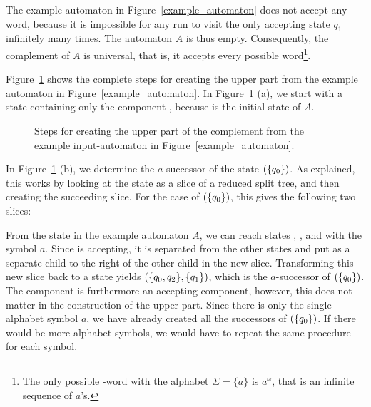 The example automaton in Figure~\ref{example_automaton} does not accept any word, because it is impossible for any run to visit the only accepting state $q_1$ infinitely many times. The automaton $A$ is thus empty. Consequently, the complement of $A$ is universal, that is, it accepts every possible word\footnote{The only possible \om-word with the alphabet $\Sigma = \{a\}$ is $a^\omega$, that is an infinite sequence of $a$'s.}.

Figure~\ref{steps_upper} shows the complete steps for creating the upper part from the example automaton in Figure~\ref{example_automaton}. In Figure~\ref{steps_upper} (a), we start with a state containing only the component , because  is the initial state of $A$.

\begin{figure}[htb]
\centering
  \begin{subfigure}[t]{0.49\textwidth}
  \centering
  \UpperPartA
  \caption{}
  \end{subfigure}
  \hfill
  \begin{subfigure}[t]{0.49\textwidth}
  \centering
  \UpperPartB
  \caption{}
  \end{subfigure}

  \begin{subfigure}[t]{0.49\textwidth}
  \centering
  \UpperPartC
  \caption{}
  \end{subfigure}
  \hfill
  \begin{subfigure}[t]{0.49\textwidth}
  \centering
  \UpperPartD
  \caption{}
  \end{subfigure}
\caption{Steps for creating the upper part of the complement from the example input-automaton in Figure~\ref{example_automaton}.}
\label{steps_upper}
\end{figure}

In Figure~\ref{steps_upper} (b), we determine the $a$-successor of the state $(\{q_{0}\})$. As explained, this works by looking at the state as a slice of a reduced split tree, and then creating the succeeding slice. For the case of $(\{q_{0}\})$, this gives the following two slices:

\begin{center}
\SlicesOne
\end{center}

From the state  in the example automaton $A$, we can reach states , , and  with the symbol $a$. Since  is accepting, it is separated from the other states and put as a separate child to the right of the other child in the new slice. Transforming this new slice back to a state yields $(\{q_{0},q_{2}\}, \{q_{1}\})$, which is the $a$-successor of $(\{q_{0}\})$. The component  is furthermore an accepting component, however, this does not matter in the construction of the upper part. Since there is only the single alphabet symbol $a$, we have already created all the successors of $(\{q_{0}\})$. If there would be more alphabet symbols, we would have to repeat the same procedure for each symbol.

